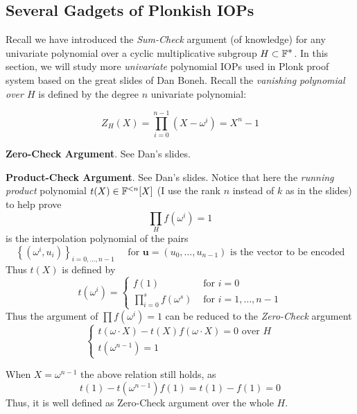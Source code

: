\documentclass{article}
\begin{document}
\subsection{Several Gadgets of Plonkish IOPs} \label{sec:sever-gadg-plonk}

Recall we have introduced the \textit{Sum-Check} argument (of knowledge) for any univariate polynomial over a cyclic multiplicative subgroup $H \subset \mathbb{F}^{\displaystyle *}$. In this section, we will study more \textit{univariate} polynomial IOPs used in Plonk proof system based on the great slides \cite{boneh2023zkmooc} of Dan Boneh. Recall the \textit{vanishing polynomial over $H$} is defined by the degree $n$ univariate polynomial:

\begin{equation*}
Z_H(X) = \prod_{i = 0}^{n-1} (X - \omega^i) = X^n - 1
\end{equation*}

\textbf{Zero-Check Argument}. See Dan's slides.

\textbf{Product-Check Argument}. See Dan's slides. Notice that here the \textit{running product} polynomial $t(X) \in \mathbb{F}^{< n} [X]$ (I use the rank $n$ instead of $k$ as in the slides) to help prove 
\begin{equation*}
\prod_H f(\omega^{i}) = 1
\end{equation*}
is the interpolation polynomial of the pairs 
\begin{equation*}
\left\{ (\omega^i, u_i) \right\}_{i = 0, \dots, n-1} \quad \text{ for } \mathbf{u} = (u_{0}, \dots, u_{n-1}) \text{ is the vector to be encoded}
\end{equation*}
Thus $t(X)$ is defined by
\begin{equation*}
t(\omega^{i}) = 
\begin{cases}
f(1)  & \text{ for } i = 0 \\
\prod_{i = 0}^s f(\omega^s) & \text{ for } i = 1, \dots, n-1
\end{cases}
\end{equation*}
Thus the argument of $\prod f(\omega^i) = 1$ can be reduced to the \textit{Zero-Check} argument 
\begin{equation} \label{eq:product-check}
\begin{cases}
t(\omega \cdot X) - t(X) f(\omega \cdot X) = 0 \text{ over } H \\
t(\omega^{n-1}) = 1
\end{cases}
\end{equation}
\begin{remark}
When $X = \omega^{n-1}$ the above relation still holds, as
\begin{equation*}
t(1) - t(\omega^{n-1}) f(1) = t(1) - f(1) = 0
\end{equation*}
Thus, it is well defined as Zero-Check argument over the whole $H$.
\end{remark}
\end{document}
